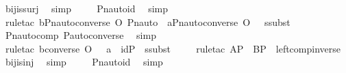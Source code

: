 \begin{isabellebody}
\ bij{\isacharunderscore}{\kern0pt}is{\isacharunderscore}{\kern0pt}surj\ \isamarkupfalse%
\ simp\ \isanewline
\ \ \isamarkupfalse%
\ Pn{\isacharunderscore}{\kern0pt}auto{\isacharunderscore}{\kern0pt}id\ \isamarkupfalse%
\ simp\ \isanewline
\ \ \isamarkupfalse%
\ {\isacharparenleft}{\kern0pt}rule{\isacharunderscore}{\kern0pt}tac\ b{\isacharequal}{\kern0pt}{\isachardoublequoteopen}Pn{\isacharunderscore}{\kern0pt}auto{\isacharparenleft}{\kern0pt}converse{\isacharparenleft}{\kern0pt}{\isasympi}{\isacharparenright}{\kern0pt}{\isacharparenright}{\kern0pt}\ O\ Pn{\isacharunderscore}{\kern0pt}auto{\isacharparenleft}{\kern0pt}{\isasympi}{\isacharparenright}{\kern0pt}{\isachardoublequoteclose}\ \ a{\isacharequal}{\kern0pt}{\isachardoublequoteopen}Pn{\isacharunderscore}{\kern0pt}auto{\isacharparenleft}{\kern0pt}converse{\isacharparenleft}{\kern0pt}{\isasympi}{\isacharparenright}{\kern0pt}\ O\ {\isasympi}{\isacharparenright}{\kern0pt}{\isachardoublequoteclose}\ \ ssubst{\isacharparenright}{\kern0pt}\ \isanewline
\ \ \isamarkupfalse%
\ Pn{\isacharunderscore}{\kern0pt}auto{\isacharunderscore}{\kern0pt}comp\ P{\isacharunderscore}{\kern0pt}auto{\isacharunderscore}{\kern0pt}converse\ \isamarkupfalse%
\ simp\ \isanewline
\ \ \isamarkupfalse%
\ {\isacharparenleft}{\kern0pt}rule{\isacharunderscore}{\kern0pt}tac\ b{\isacharequal}{\kern0pt}{\isachardoublequoteopen}converse{\isacharparenleft}{\kern0pt}{\isasympi}{\isacharparenright}{\kern0pt}\ O\ {\isasympi}{\isachardoublequoteclose}\ \ a\ {\isacharequal}{\kern0pt}\ {\isachardoublequoteopen}id{\isacharparenleft}{\kern0pt}P{\isacharparenright}{\kern0pt}{\isachardoublequoteclose}\ \ ssubst{\isacharparenright}{\kern0pt}\ \isanewline
\ \ \isamarkupfalse%
\ {\isacharparenleft}{\kern0pt}rule{\isacharunderscore}{\kern0pt}tac\ A{\isacharequal}{\kern0pt}P\ \ B{\isacharequal}{\kern0pt}P\ \ left{\isacharunderscore}{\kern0pt}comp{\isacharunderscore}{\kern0pt}inverse{\isacharparenright}{\kern0pt}\ \isamarkupfalse%
\ bij{\isacharunderscore}{\kern0pt}is{\isacharunderscore}{\kern0pt}inj\ \isamarkupfalse%
\ simp\ \isanewline
\ \ \isamarkupfalse%
\ Pn{\isacharunderscore}{\kern0pt}auto{\isacharunderscore}{\kern0pt}id\ \isamarkupfalse%
\ simp\ \isanewline
{}\isamarkupfalse%
\ {\isacharminus}{\kern0pt}\ \isanewline
\ \ \isamarkupfalse%

\end{isabellebody}
